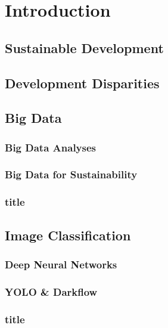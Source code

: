 	\section{Introduction}
		
		
		\subsection{Sustainable Development}
		
		
		
		\subsection{Development Disparities}
		
		
		
		\subsection{Big Data}
			\subsubsection{Big Data Analyses}
			
			\subsubsection{Big Data for Sustainability}
			
			\subsubsection{title}
			
			
			
		\subsection{Image Classification}
			\subsubsection{Deep Neural Networks}
			
			\subsubsection{YOLO \& Darkflow}
			
			\subsubsection{title}
			
